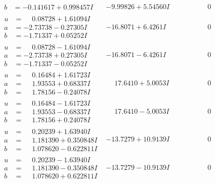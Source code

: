 \documentclass[1p]{elsarticle_modified}
\theoremstyle{definition}
\begin{document}
$$\begin{array}{c|c|c}
\begin{aligned}
b &= -0.141617 + 0.998457 I\end{aligned}
 & -9.99826 + 5.54560 I & \phantom{-0.000000 } 0 \\ \hline\begin{aligned}
u &= \phantom{-}0.08728 + 1.61094 I \\
a &= -2.73738 - 0.27305 I \\
b &= -1.71337 + 0.05252 I\end{aligned}
 & -16.8071 + 6.4261 I & \phantom{-0.000000 } 0 \\ \hline\begin{aligned}
u &= \phantom{-}0.08728 - 1.61094 I \\
a &= -2.73738 + 0.27305 I \\
b &= -1.71337 - 0.05252 I\end{aligned}
 & -16.8071 - 6.4261 I & \phantom{-0.000000 } 0 \\ \hline\begin{aligned}
u &= \phantom{-}0.16484 + 1.61723 I \\
a &= \phantom{-}1.93553 + 0.68337 I \\
b &= \phantom{-}1.78156 - 0.24078 I\end{aligned}
 & \phantom{-}17.6410 + 5.0053 I & \phantom{-0.000000 } 0 \\ \hline\begin{aligned}
u &= \phantom{-}0.16484 - 1.61723 I \\
a &= \phantom{-}1.93553 - 0.68337 I \\
b &= \phantom{-}1.78156 + 0.24078 I\end{aligned}
 & \phantom{-}17.6410 - 5.0053 I & \phantom{-0.000000 } 0 \\ \hline\begin{aligned}
u &= \phantom{-}0.20239 + 1.63940 I \\
a &= \phantom{-}1.181390 + 0.350848 I \\
b &= \phantom{-}1.078620 - 0.622811 I\end{aligned}
 & -13.7279 + 10.9139 I & \phantom{-0.000000 } 0 \\ \hline\begin{aligned}
u &= \phantom{-}0.20239 - 1.63940 I \\
a &= \phantom{-}1.181390 - 0.350848 I \\
b &= \phantom{-}1.078620 + 0.622811 I\end{aligned}
 & -13.7279 - 10.9139 I & \phantom{-0.000000 } 0 \\ \hline\begin{aligned}

\end{aligned}
\end{array}$$
\end{document}

